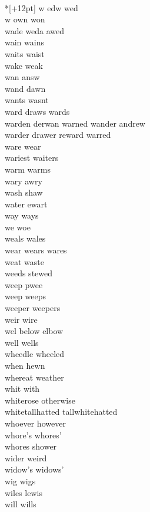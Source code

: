 \vspace{14pt}
\noindent\notextbf{\LargeW}\\*[+12pt]
w edw wed  \\
w own won  \\
wade weda awed\\
wain wains \\
waits waist\\
wake weak\\
wan answ \\
wand dawn\\
wants wasnt\\
ward draws wards \\
warden derwan warned wander andrew\\
warder drawer reward warred\\
ware wear\\
wariest waiters\\
warm warms \\
wary awry\\
wash shaw\\
water ewart\\
way ways \\
we woe \\
weals wales\\
wear wears wares \\
weat waste \\
weeds stewed \\
weep pwee\\
weep weeps \\
weeper weepers \\
weir wire\\
wel below elbow  \\
well wells \\
wheedle wheeled\\
when hewn\\
whereat weather\\
whit with\\
whiterose otherwise\\
whitetallhatted tallwhitehatted\\
whoever however\\
whore's whores'\\
whores shower\\
wider weird\\
widow's widows'\\
wig wigs \\
wiles lewis\\
will wills \\
